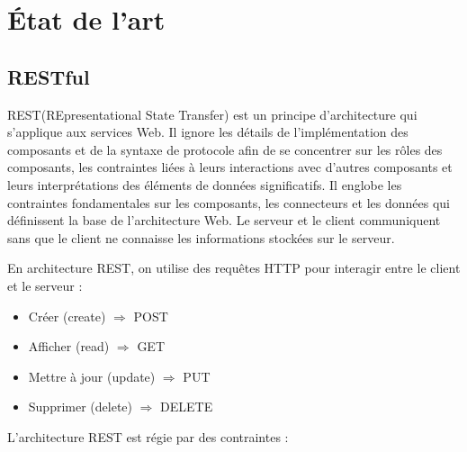 \chapter{État de l'art}

\section{RESTful}

REST(REpresentational State Transfer) \cite{Fie00} est un principe d'architecture qui s'applique aux services Web. Il ignore les détails de l'implémentation des composants et de la syntaxe de protocole afin de se concentrer sur les rôles des composants, les contraintes liées à leurs interactions avec d'autres composants et leurs interprétations des éléments de données significatifs. Il englobe les contraintes fondamentales sur les composants, les connecteurs et les données qui définissent la base de l'architecture Web. Le serveur et le client communiquent sans que le client ne connaisse les informations stockées sur le serveur.
\newline

\noindent
En architecture REST, on utilise des requêtes HTTP pour interagir entre le client et le serveur :
\begin{itemize}
    \item Créer (create) $\Rightarrow$ POST
    \item Afficher (read) $\Rightarrow$ GET
    \item Mettre à jour (update) $\Rightarrow$ PUT
    \item Supprimer (delete) $\Rightarrow$ DELETE
\end{itemize}

\noindent
L'architecture REST est régie par des contraintes :

